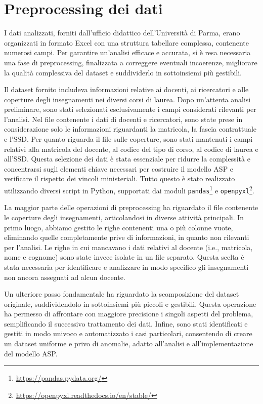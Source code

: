 \section{Preprocessing dei dati}
\label{sec:pre-proc}

I dati analizzati, forniti dall'ufficio didattico dell'Università di Parma, 
erano organizzati in formato Excel con una struttura tabellare complessa, contenente 
numerosi campi. Per garantire un'analisi efficace e accurata, si è resa necessaria una 
fase di preprocessing, finalizzata a correggere eventuali incoerenze, migliorare la 
qualità complessiva del dataset e suddividerlo in sottoinsiemi più gestibili.

Il dataset fornito includeva informazioni relative ai docenti, ai ricercatori e alle 
coperture degli insegnamenti nei diversi corsi di laurea. Dopo un'attenta analisi 
preliminare, sono stati selezionati esclusivamente i campi considerati rilevanti per 
l'analisi. Nel file contenente i dati di docenti e ricercatori, sono state prese in 
considerazione solo le informazioni riguardanti la matricola, la fascia contrattuale 
e l'SSD. Per quanto riguarda il file sulle coperture, sono stati mantenuti i campi 
relativi alla matricola del docente, al codice del tipo di corso, al codice 
di laurea e all'SSD. Questa selezione dei dati è stata essenziale per ridurre la complessità e concentrarsi 
sugli elementi chiave necessari per costruire il modello ASP e verificare il rispetto 
dei vincoli ministeriali. Tutto questo è stato realizzato utilizzando diversi script in 
Python, supportati dai moduli \texttt{pandas}\footnote{\url{https://pandas.pydata.org/}} 
e \texttt{openpyxl}\footnote{\url{https://openpyxl.readthedocs.io/en/stable/}}.

La maggior parte delle operazioni di preprocessing ha riguardato il file contenente 
le coperture degli insegnamenti, articolandosi in diverse attività principali. 
In primo luogo, abbiamo gestito le righe contenenti una o più colonne vuote, 
eliminando quelle completamente prive di informazioni, in quanto non rilevanti 
per l'analisi. Le righe in cui mancavano i dati relativi al docente (i.e., matricola, 
nome e cognome) sono state invece isolate in un file separato. Questa scelta è stata 
necessaria per identificare e analizzare in modo specifico gli insegnamenti non 
ancora assegnati ad alcun docente.

Un ulteriore passo fondamentale ha riguardato la scomposizione del dataset originale, 
suddividendolo in sottoinsiemi più piccoli e gestibili. Questa operazione ha permesso 
di affrontare con maggiore precisione i singoli aspetti del problema, semplificando il 
successivo trattamento dei dati. Infine, sono stati identificati e gestiti in modo 
univoco e automatizzato i casi particolari, consentendo di creare un dataset uniforme 
e privo di anomalie, adatto all'analisi e all'implementazione del modello ASP.

